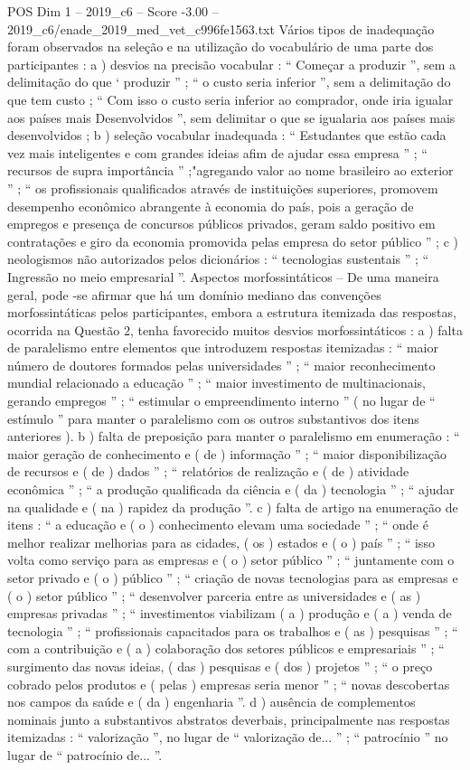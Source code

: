 \begin{textsample}{POS Dim 1 – 2019\_c6 – Score -3.00 – 2019\_c6/enade\_2019\_med\_vet\_c996fe1563.txt}
Vários tipos de inadequação foram observados na seleção e na utilização do vocabulário de uma parte dos participantes : a ) desvios na precisão vocabular : “ Começar a produzir ”, sem a delimitação do que ‘ produzir ” ; “ o custo seria inferior ”, sem a delimitação do que tem custo ; “ Com isso o custo seria inferior ao comprador, onde iria igualar aos países mais Desenvolvidos ”, sem delimitar o que se igualaria aos países mais desenvolvidos ; b ) seleção vocabular inadequada : “ Estudantes que estão cada vez mais inteligentes e com grandes ideias afim de ajudar essa empresa ” ; “ recursos de supra importância ” ;"agregando valor ao nome brasileiro ao exterior ” ; “ os profissionais qualificados através de instituições superiores, promovem desempenho econômico abrangente à economia do país, pois a geração de empregos e presença de concursos públicos privados, geram saldo positivo em contratações e giro da economia promovida pelas empresa do setor público ” ; c ) neologismos não autorizados pelos dicionários : “ tecnologias sustentais ” ; “ Ingressão no meio empresarial ”.
Aspectos morfossintáticos – De uma maneira geral, pode -se afirmar que há um domínio mediano das convenções morfossintáticas pelos participantes, embora a estrutura itemizada das respostas, ocorrida na Questão 2, tenha favorecido muitos desvios morfossintáticos : a ) falta de paralelismo entre elementos que introduzem respostas itemizadas : “ maior número de doutores formados pelas universidades ” ; “ maior reconhecimento mundial relacionado a educação ” ; “ maior investimento de multinacionais, gerando empregos ” ; “ estimular o empreendimento interno ” ( no lugar de “ estímulo ” para manter o paralelismo com os outros substantivos dos itens anteriores ). b ) falta de preposição para manter o paralelismo em enumeração : “ maior geração de conhecimento e ( de ) informação ” ; “ maior disponibilização de recursos e ( de ) dados ” ; “ relatórios de realização e ( de ) atividade econômica ” ; “ a produção qualificada da ciência e ( da ) tecnologia ” ; “ ajudar na qualidade e ( na ) rapidez da produção ”. c ) falta de artigo na enumeração de itens : “ a educação e ( o ) conhecimento elevam uma sociedade ” ; “ onde é melhor realizar melhorias para as cidades, ( os ) estados e ( o ) país ” ; “ isso volta como serviço para as empresas e ( o ) setor público ” ; “ juntamente com o setor privado e ( o ) público ” ; “ criação de novas tecnologias para as empresas e ( o ) setor público ” ; “ desenvolver parceria entre as universidades e ( as ) empresas privadas ” ; “ investimentos viabilizam ( a ) produção e ( a ) venda de tecnologia ” ; “ profissionais capacitados para os trabalhos e ( as ) pesquisas ” ; “ com a contribuição e ( a ) colaboração dos setores públicos e empresariais ” ; “ surgimento das novas ideias, ( das ) pesquisas e ( dos ) projetos ” ; “ o preço cobrado pelos produtos e ( pelas ) empresas seria menor ” ; “ novas descobertas nos campos da saúde e ( da ) engenharia ”. d ) ausência de complementos nominais junto a substantivos abstratos deverbais, principalmente nas respostas itemizadas : “ valorização ”, no lugar de “ valorização de... ” ; “ patrocínio ” no lugar de “ patrocínio de... ”.

\end{textsample}
